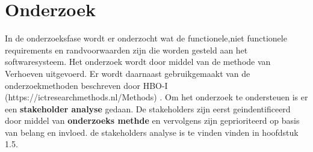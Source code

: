 \chapter{Onderzoek}
In de onderzoeksfase wordt er onderzocht wat de functionele,niet functionele requirements en randvoorwaarden zijn die
worden gesteld aan het softwaresysteem. Het onderzoek wordt door middel van de methode van
Verhoeven uitgevoerd. Er wordt daarnaast gebruikgemaakt van de onderzoekmethoden beschreven door
HBO-I (https://ictresearchmethods.nl/Methods) .
Om het onderzoek te ondersteuen is er een \textbf{stakeholder analyse} gedaan.
De stakeholders zijn eerst geindentificeerd door middel van \textbf{onderzoeks methde} en vervolgens zijn geprioriteerd op basis van belang en invloed.
de stakeholders analyse is te vinden vinden in hoofdstuk 1.5. 






